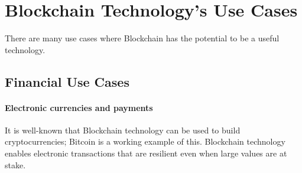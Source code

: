
\section{Blockchain Technology's Use Cases}
\label{sec:use-cases}

There are many use cases where Blockchain has the potential to be a useful technology.

\subsection{Financial Use Cases}

\paragraph{Electronic currencies and payments}


It is well-known that Blockchain technology can be used to build cryptocurrencies; Bitcoin is a working example of this.
Blockchain technology enables electronic transactions that are resilient even when large values are at stake.

